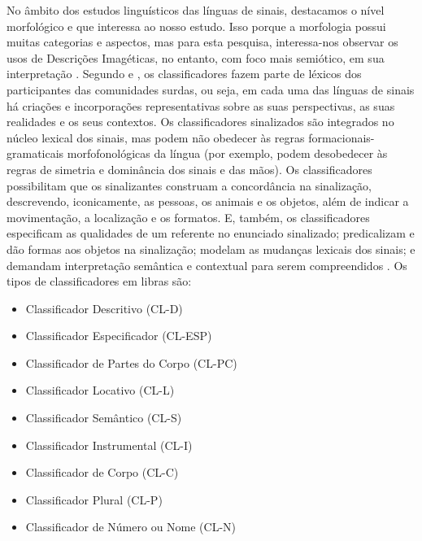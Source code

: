 \documentclass[portuguese]{textolivre}
\begin{document}
No âmbito dos estudos linguísticos das línguas de sinais, destacamos o nível morfológico e que interessa ao nosso estudo. Isso porque a morfologia possui muitas categorias e aspectos, mas para esta pesquisa, interessa-nos observar os usos de Descrições Imagéticas, no entanto, com foco mais semiótico, em sua interpretação \cite{campello2008visualidade}. Segundo \textcite[p. 92-94]{quadros2004libras} e \textcite[p. 87-100]{castro2012}, os classificadores fazem parte de léxicos dos participantes das comunidades surdas, ou seja, em cada uma das línguas de sinais há criações e incorporações representativas sobre as suas perspectivas, as suas realidades e os seus contextos. Os classificadores sinalizados são integrados no núcleo lexical dos sinais, mas podem não obedecer às regras formacionais-gramaticais morfofonológicas da língua (por exemplo, podem desobedecer às regras de simetria e dominância dos sinais e das mãos). Os classificadores possibilitam que os sinalizantes construam a concordância na sinalização, descrevendo, iconicamente, as pessoas, os animais e os objetos, além de indicar a movimentação, a localização e os formatos. E, também, os classificadores especificam as qualidades de um referente no enunciado sinalizado; predicalizam e dão formas aos objetos na sinalização; modelam as mudanças lexicais dos sinais; e demandam interpretação semântica e contextual para serem compreendidos \cite{quadros2004libras,castro2012}. Os tipos de classificadores em libras são: 
\begin{itemize}
    \item Classificador Descritivo (CL-D)
    \item Classificador Especificador (CL-ESP)
    \item Classificador de Partes do Corpo (CL-PC)
    \item Classificador Locativo (CL-L)
    \item Classificador Semântico (CL-S)
    \item Classificador Instrumental (CL-I)
    \item Classificador de Corpo (CL-C)
    \item Classificador Plural (CL-P)
    \item Classificador de Número ou Nome (CL-N)
\end{itemize}
\end{document}
